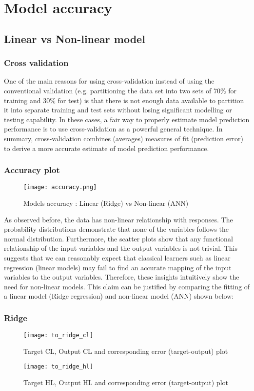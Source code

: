 \section{Model accuracy}
  \subsection{Linear vs Non-linear model}
  \subsubsection{Cross validation}
    One of the main reasons for using cross-validation instead of using the conventional validation (e.g. partitioning the data set into two sets of 70\% for training and 30\% for test) is that there is not enough data available to partition it into separate training and test sets without losing significant modelling or testing capability. In these cases, a fair way to properly estimate model prediction performance is to use cross-validation as a powerful general technique. In summary, cross-validation combines (averages) measures of fit (prediction error) to derive a more accurate estimate of model prediction performance.
  \subsubsection{Accuracy plot}
  \begin{figure}[h!]
      \centering
      \texttt{[image: accuracy.png]}
      \caption{Models accuracy : Linear (Ridge) vs Non-linear (ANN)}
      \label{fig:accuracy}                    
  \end{figure}
  \newpage
  As observed before, the data has non-linear relationship with responses. The probability distributions demonstrate that none of the variables follows the normal distribution. Furthermore, the scatter plots show that any functional relationship of the input variables and the output variables is not trivial. This suggests that we can reasonably expect that classical learners such as linear regression (linear models) may fail to find an accurate mapping of the input variables to the output variables. Therefore, these insights intuitively show the need for non-linear models. This claim can be justified by comparing the fitting of a linear model (Ridge regression) and non-linear model (ANN) shown below:

  \subsubsection{Ridge}
  \begin{figure}[h!]
      \centering
      \texttt{[image: to\_ridge\_cl]}
      \caption{Target CL, Output CL and corresponding error (target-output) plot}
      \label{fig:to_ridge_cl}                    
  \end{figure}
  \begin{figure}[h!]
      \centering
      \texttt{[image: to\_ridge\_hl]}
      \caption{Target HL, Output HL and corresponding error (target-output) plot}
      \label{fig:to_ridge_hl}                    
  \end{figure}
  \newpage
